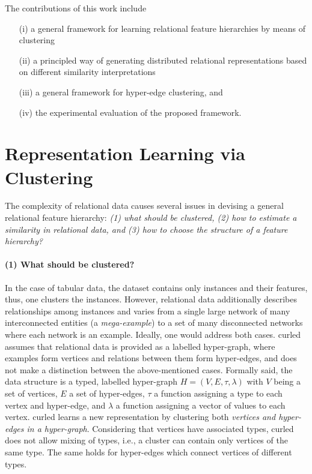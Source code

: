 The contributions of this work include
\begin{itemize}
	\item[(i)] a general framework for learning relational feature hierarchies by means of clustering
	\item[(ii)] a principled way of generating distributed relational representations based on different similarity interpretations
	\item[(iii)] a general framework for hyper-edge clustering, and
	\item[(iv)] the experimental evaluation of the proposed framework.
\end{itemize}



\section{Representation Learning via Clustering}
\label{sec:RL}

The complexity of relational data causes several issues in devising a general relational feature hierarchy: \textit{(1) what should be clustered, (2) how to estimate a similarity in relational data, and (3) how to choose the structure of a feature hierarchy? }


\paragraph{(1) What should be clustered?}
In the case of tabular data, the dataset contains only instances and their features, thus, one clusters the instances.
However, relational data additionally describes relationships among instances and  varies from a single large network of many interconnected entities (a \textit{mega-example}) to a set of many disconnected networks where each network is an example.
Ideally, one would address both cases.
\gls{curled} assumes that relational data is provided as a labelled hyper-graph, where examples form vertices and relations between them form hyper-edges, and does not make a distinction between the above-mentioned cases.
Formally said, the data structure is a typed, labelled hyper-graph $H = (V,E, \tau, \lambda)$ with $V$ being a set of vertices, $E$ a set of hyper-edges, $\tau$  a function  assigning a type to each vertex and hyper-edge, and $\lambda$ a function assigning a vector of values to each vertex.
\gls{curled} learns a new representation by clustering both \textit{vertices and hyper-edges in a hyper-graph}.
Considering that vertices have associated types, \gls{curled} does not allow mixing of types, i.e., a cluster can contain only vertices of the same type.
The same holds for hyper-edges which connect vertices of different types.





